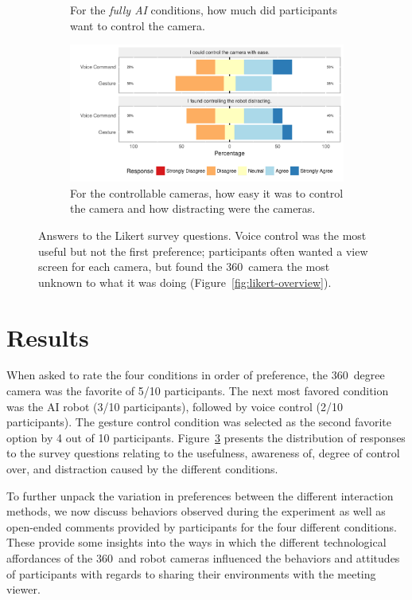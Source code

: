 \documentclass{tufte-handout}
\begin{document}
\begin{figure}
\begin{subfigure}[b]{0.6\textwidth}
  \caption{\label{fig:likert-no-control} For the \textit{fully AI}
    conditions, how much did participants want to control the camera.}
\vspace{1pc}
\end{subfigure}
\begin{subfigure}[b]{0.6\textwidth}
  \centering
  \includegraphics[width=\textwidth]{figures/likerts/likert-woz-3}
  \caption{\label{fig:likert-control} For the controllable cameras,
    how easy it was to control the camera and how distracting were the
  cameras.}
\vspace{1pc}
\end{subfigure}
  \caption{\label{fig:likerts} Answers to the Likert survey
    questions. Voice control was the most useful but not the first
    preference; participants often wanted a view screen for each
    camera, but found the 360\textdegree\ camera the most unknown to
    what it was doing (Figure~\ref{fig:likert-overview}).}
\end{figure}

\section{Results}
When asked to rate the four conditions in order of preference, the
360\textdegree\ degree camera was the favorite of 5/10
participants. The next most favored condition was the AI robot (3/10
participants), followed by voice control (2/10 participants).  The
gesture control condition was selected as the second favorite option
by 4 out of 10 participants.  Figure~\ref{fig:likerts} presents the
distribution of responses to the survey questions relating to the
usefulness, awareness of, degree of control over, and distraction
caused by the different conditions.

To further unpack the variation in preferences between the different
interaction methods, we now discuss behaviors observed during the
experiment as well as open-ended comments provided by participants for
the four different conditions. These provide some insights into the
ways in which the different technological affordances of the
360\textdegree\ and robot cameras influenced the behaviors and
attitudes of participants with regards to sharing their environments
with the meeting viewer.
\end{document}
